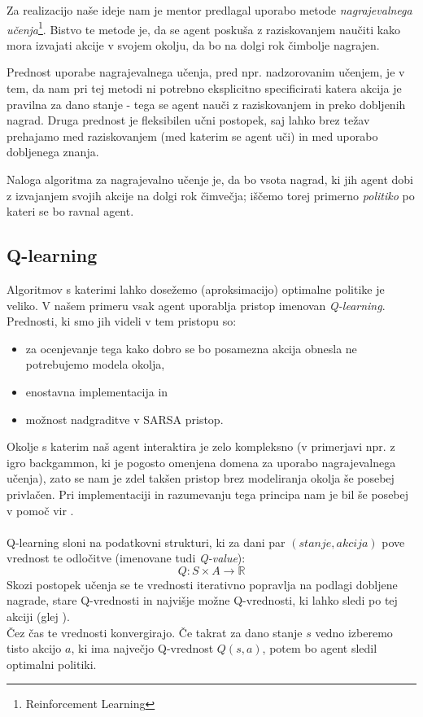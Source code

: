 \documentclass[a4paper,10pt]{article}
\begin{document}
Za realizacijo naše ideje nam je mentor predlagal uporabo metode \textit{nagrajevalnega učenja}\footnote{Reinforcement Learning}. Bistvo te metode je, da se 
agent poskuša z raziskovanjem naučiti kako mora izvajati akcije v svojem okolju, da bo na dolgi rok čimbolje nagrajen.

Prednost uporabe nagrajevalnega učenja, pred npr. nadzorovanim učenjem, je v tem, da nam pri tej metodi ni potrebno eksplicitno specificirati katera akcija
je pravilna za dano stanje - tega se agent nauči z raziskovanjem in preko dobljenih nagrad. Druga prednost je fleksibilen učni postopek, saj lahko brez težav prehajamo med raziskovanjem 
(med katerim se agent uči) in med uporabo dobljenega znanja.

Naloga algoritma za nagrajevalno učenje je, da bo vsota nagrad, ki jih agent dobi z izvajanjem svojih akcije na dolgi rok čimvečja; iščemo torej primerno
\textit{politiko} po kateri se bo ravnal agent. 

\subsection{Q-learning}
Algoritmov s katerimi lahko dosežemo (aproksimacijo) optimalne politike je veliko. V našem primeru vsak agent
uporablja pristop imenovan \textit{Q-learning}\cite{rl}. Prednosti, ki smo jih videli v tem pristopu so:
\begin{itemize}
 \item za ocenjevanje tega kako dobro se bo posamezna akcija obnesla ne potrebujemo modela okolja,
 \item enostavna implementacija in
 \item možnost nadgraditve v SARSA pristop.
\end{itemize}
Okolje s katerim naš agent interaktira je zelo kompleksno (v primerjavi npr. z igro backgammon, ki je pogosto omenjena domena za uporabo nagrajevalnega učenja),
zato se nam je zdel takšen pristop brez modeliranja okolja še posebej privlačen. Pri implementaciji in razumevanju tega principa nam je bil še posebej v pomoč 
vir \cite{rl}.\\\\
Q-learning sloni na podatkovni strukturi, ki za dani par $(stanje, akcija)$ pove vrednost te odločitve (imenovane tudi \textit{Q-value}):
$$Q: S\times A \rightarrow \mathbb{R}$$
Skozi postopek učenja se te vrednosti iterativno popravlja na podlagi dobljene nagrade, stare Q-vrednosti in najvišje možne Q-vrednosti, ki lahko sledi po tej 
akciji (glej \cite{ql}).\\
Čez čas te vrednosti konvergirajo. Če takrat za dano stanje $s$ vedno izberemo tisto akcijo $a$, ki ima največjo Q-vrednost $Q(s, a)$, potem bo agent sledil
optimalni politiki.
\end{document}

